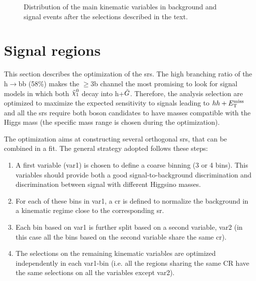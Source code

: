 \begin{figure}[htbp]
\caption{Distribution of  the main kinematic variables in background and signal events after the selections described in the text.}
\label{fig:ewk:sig:1}
\end{figure}

\FloatBarrier

\section{Signal regions}

This section describes the optimization of the \glspl{sr}. 
The high branching ratio of the h$\rightarrow$bb (58\%) makes the $\geq$3b channel the most promising to look for signal models 
in which both $\ninoone$ decay into h+$\tilde{G}$. 
Therefore, the analysis selection are optimized to maximize the expected sensitivity to signals leading to $hh+E_{\rm T}^{\mathrm{miss}}$ 
and all the \glspl{sr} require both boson candidates to have masses compatible with the Higgs mass (the specific mass range is chosen during the optimization). 

The optimization aims at constructing several orthogonal \glspl{sr}, that can be combined in a fit. 
The general strategy adopted follows these steps:
\begin{enumerate}
\item A first variable (var1) is chosen to define a coarse binning (3 or 4 bins). 
    This variables should provide both a good signal-to-background discrimination and discrimination between signal 
    with different Higgsino masses.
\item For each of these bins in var1, a \gls{cr} is defined to normalize the \ttbar background in a kinematic regime close to the corresponding \gls{sr}.
\item Each bin based on var1 is further split based on a second variable, var2 (in this case all the bins based on the second variable share the same \gls{cr}).
\item The selections on the remaining kinematic variables are optimized independently in each var1-bin (i.e. all the regions sharing the same CR have the same selections on all the variables except var2).
\end{enumerate}

